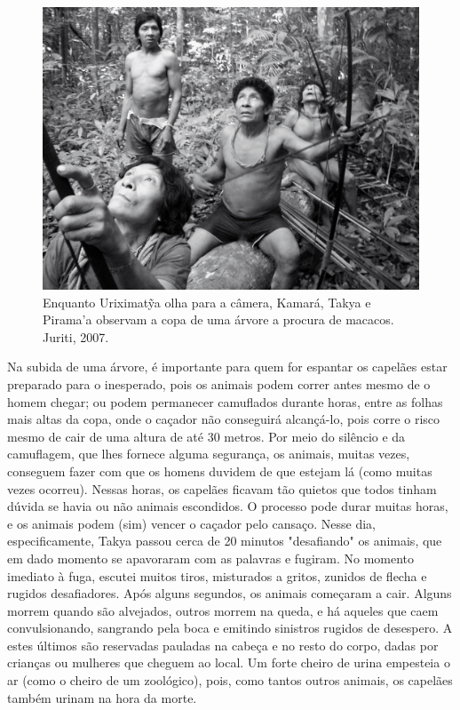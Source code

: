 \begin{figure}[H]
\centering
  \includegraphics[width=\textwidth]{./imgs/100_5208}
\caption{Enquanto Uriximatỹa olha para a câmera, Kamará, Takya e Pirama’a observam a copa de uma árvore a procura de macacos. Juriti, 2007.}
\end{figure}

Na subida de uma árvore, é importante para quem for espantar os capelães
estar preparado para o inesperado, pois os animais podem correr antes
mesmo de o homem chegar; ou podem permanecer camuflados durante horas,
entre as folhas mais altas da copa, onde o caçador não conseguirá
alcançá-lo, pois corre o risco mesmo de cair de uma altura de até 30
metros. Por meio do silêncio e da camuflagem, que lhes fornece alguma
segurança, os animais, muitas vezes, conseguem fazer com que os homens
duvidem de que estejam lá (como muitas vezes ocorreu). Nessas horas, os
capelães ficavam tão quietos que todos tinham dúvida se havia ou não
animais escondidos. O processo pode durar muitas horas, e os animais
podem (sim) vencer o caçador pelo cansaço. Nesse dia, especificamente,
Takya passou cerca de 20 minutos "desafiando" os animais, que em dado
momento se apavoraram com as palavras e fugiram. No momento imediato à
fuga, escutei muitos tiros, misturados a gritos, zunidos de flecha e
rugidos desafiadores. Após alguns segundos, os animais começaram a cair.
Alguns morrem quando são alvejados, outros morrem na queda, e há aqueles
que caem convulsionando, sangrando pela boca e emitindo sinistros
rugidos de desespero. A estes últimos são reservadas pauladas na cabeça
e no resto do corpo, dadas por crianças ou mulheres que cheguem ao
local. Um forte cheiro de urina empesteia o ar (como o cheiro de um
zoológico), pois, como tantos outros animais, os capelães também urinam
na hora da morte.

